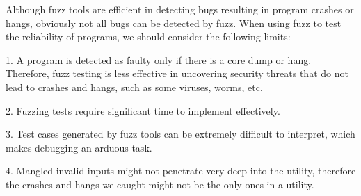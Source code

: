 




Although fuzz tools are efficient in detecting bugs resulting in program crashes or hangs, obviously not all bugs can be detected by fuzz. When using fuzz to test the reliability of programs, we should consider the following limits:

1. A program is detected as faulty only if there is a core dump or hang. Therefore, fuzz testing is less effective in uncovering security threats that do not lead to crashes and hangs, such as some viruses, worms, etc.

2. Fuzzing tests require significant time to implement effectively.

3. Test cases generated by fuzz tools can be extremely difficult to interpret, which makes debugging an arduous task.

4. Mangled invalid inputs might not penetrate very deep into the utility, therefore the crashes and hangs we caught might not be the only ones in a utility.


